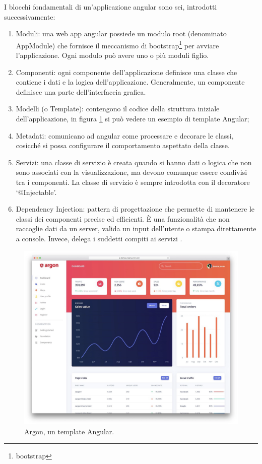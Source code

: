 I blocchi fondamentali di un'applicazione \gls{angular} sono sei, introdotti successivamente:
\begin{enumerate}
    \item Moduli: una web app \gls{angular} possiede un modulo root (denominato AppModule) che fornisce il meccanismo di bootstrap\footnote{\glsdesc{bootstrap}} per avviare l'applicazione. Ogni modulo può avere uno o più moduli figlio.
    \item Componenti: ogni componente dell'applicazione definisce una classe che contiene i dati e la logica dell'applicazione. Generalmente, un componente definisce una parte dell'interfaccia grafica.
    \item Modelli (o Template): contengono il codice della struttura iniziale dell'applicazione, in figura \ref{fig:berry} si può vedere un esempio di template Angular;
    \item Metadati: comunicano ad \gls{angular} come processare e decorare le classi, cosicché si possa configurare il comportamento aspettato della classe.
    \item Servizi: una classe di servizio è creata quando si hanno dati o logica che non sono associati con la visualizzazione, ma devono comunque essere condivisi tra i componenti. La classe di servizio è sempre introdotta con il decoratore `@Injectable'.
    \item Dependency Injection: pattern di progettazione che permette di mantenere le classi dei componenti precise ed efficienti. È una funzionalità che non raccoglie dati da un server, valida un input dell'utente o stampa direttamente a console. Invece, delega i suddetti compiti ai servizi \cite{anginj}.
\end{enumerate}

\begin{figure}[H]
\centering
\includegraphics[width=.75\textwidth]{Images/argon.png}
\caption{\label{fig:berry}Argon, un template Angular.}
\end{figure}

